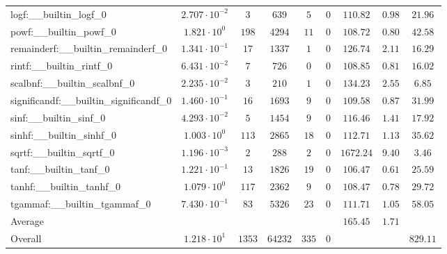 \begin{tabular}{|l|c|c|c|c|c|c|c|c|}
logf:\_\_builtin\_logf\_0                 & $ 2.707 \cdot 10^{-2} $ & $ 3      $ & $ 639   $ & $ 5   $ & $ 0   $ & $ 110.82      $ & $ 0.98    $ & $ 21.96   $ \\
powf:\_\_builtin\_powf\_0                 & $ 1.821 \cdot 10^{0}  $ & $ 198    $ & $ 4294  $ & $ 11  $ & $ 0   $ & $ 108.72      $ & $ 0.80    $ & $ 42.58   $ \\
remainderf:\_\_builtin\_remainderf\_0     & $ 1.341 \cdot 10^{-1} $ & $ 17     $ & $ 1337  $ & $ 1   $ & $ 0   $ & $ 126.74      $ & $ 2.11    $ & $ 16.29   $ \\
rintf:\_\_builtin\_rintf\_0               & $ 6.431 \cdot 10^{-2} $ & $ 7      $ & $ 726   $ & $ 0   $ & $ 0   $ & $ 108.85      $ & $ 0.81    $ & $ 16.02   $ \\
scalbnf:\_\_builtin\_scalbnf\_0           & $ 2.235 \cdot 10^{-2} $ & $ 3      $ & $ 210   $ & $ 1   $ & $ 0   $ & $ 134.23      $ & $ 2.55    $ & $ 6.85    $ \\
significandf:\_\_builtin\_significandf\_0 & $ 1.460 \cdot 10^{-1} $ & $ 16     $ & $ 1693  $ & $ 9   $ & $ 0   $ & $ 109.58      $ & $ 0.87    $ & $ 31.99   $ \\
sinf:\_\_builtin\_sinf\_0                 & $ 4.293 \cdot 10^{-2} $ & $ 5      $ & $ 1454  $ & $ 9   $ & $ 0   $ & $ 116.46      $ & $ 1.41    $ & $ 17.92   $ \\
sinhf:\_\_builtin\_sinhf\_0               & $ 1.003 \cdot 10^{0}  $ & $ 113    $ & $ 2865  $ & $ 18  $ & $ 0   $ & $ 112.71      $ & $ 1.13    $ & $ 35.62   $ \\
sqrtf:\_\_builtin\_sqrtf\_0               & $ 1.196 \cdot 10^{-3} $ & $ 2      $ & $ 288   $ & $ 2   $ & $ 0   $ & $ 1672.24     $ & $ 9.40    $ & $ 3.46    $ \\
tanf:\_\_builtin\_tanf\_0                 & $ 1.221 \cdot 10^{-1} $ & $ 13     $ & $ 1826  $ & $ 19  $ & $ 0   $ & $ 106.47      $ & $ 0.61    $ & $ 25.59   $ \\
tanhf:\_\_builtin\_tanhf\_0               & $ 1.079 \cdot 10^{0}  $ & $ 117    $ & $ 2362  $ & $ 9   $ & $ 0   $ & $ 108.47      $ & $ 0.78    $ & $ 29.72   $ \\
tgammaf:\_\_builtin\_tgammaf\_0           & $ 7.430 \cdot 10^{-1} $ & $ 83     $ & $ 5326  $ & $ 23  $ & $ 0   $ & $ 111.71      $ & $ 1.05    $ & $ 58.05   $ \\
\hline
Average                                   & $                     $ & $        $ & $       $ & $     $ & $     $ & $ 165.45      $ & $ 1.71    $ & $         $ \\
\hline
Overall                                   & $ 1.218 \cdot 10^{1}  $ & $ 1353   $ & $ 64232 $ & $ 335 $ & $ 0   $ & $             $ & $         $ & $ 829.11  $ \\
\hline
\end{tabular}
